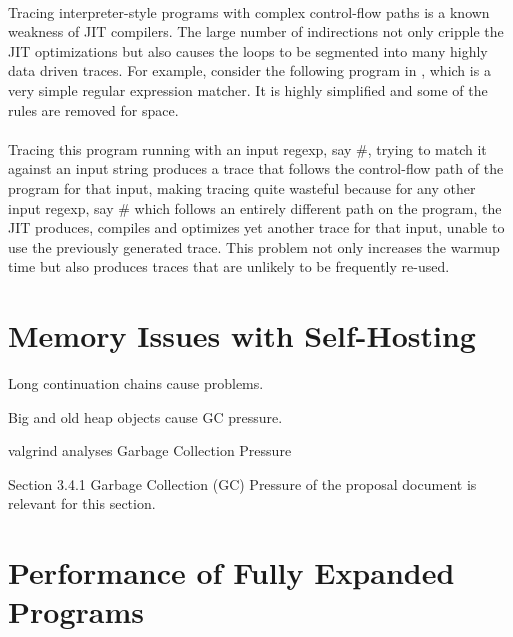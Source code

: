 
		\paragraph{}%
		Tracing interpreter-style programs with complex control-flow paths is
		a known weakness of JIT compilers. The large number of indirections
		not only cripple the JIT optimizations but also causes the loops to be
		segmented into many highly data driven traces. For
		example, consider the following program in , which
		is a very simple regular expression matcher. It is highly simplified
		and some of the rules are removed for space.

		\paragraph{}%
		Tracing this program running with an input regexp, say
		$\mathtt{\#}$, trying to match it against an
		input string produces a trace that follows the control-flow path of
		the program for that input, making tracing quite wasteful because for
		any other input regexp, say $\mathtt{\#}$ which
		follows an entirely different path on the program, the JIT produces,
		compiles and optimizes yet another trace for that input, unable to use
		the previously generated trace. This problem not only increases the
		warmup time but also produces traces that are unlikely to be
		frequently re-used.



	\section{Memory Issues with Self-Hosting}
	\label{section:memory}

		\begin{mainpoint}
			Long continuation chains cause problems.

			Big and old heap objects cause GC pressure.
		\end{mainpoint}

		valgrind analyses
		Garbage Collection Pressure

		\begin{todo}[Import]
			Section 3.4.1 Garbage Collection (GC) Pressure of the proposal document is relevant for this section.
		\end{todo}

	\section{Performance of Fully Expanded Programs}
	\label{section:cross-benchmarks}

